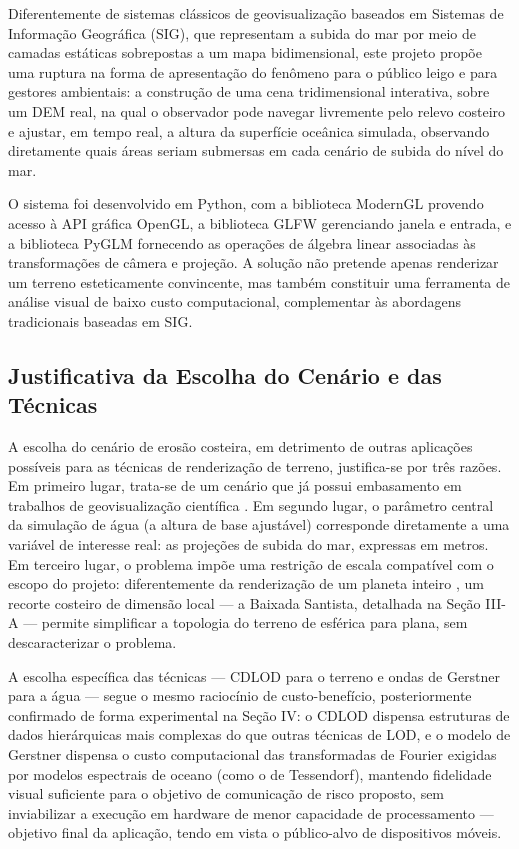 \documentclass[conference]{IEEEtran}
\begin{document}
Diferentemente de sistemas clássicos de geovisualização baseados em
Sistemas de Informação Geográfica (SIG), que representam a subida do mar
por meio de camadas estáticas sobrepostas a um mapa bidimensional, este
projeto propõe uma ruptura na forma de apresentação do fenômeno para o
público leigo e para gestores ambientais: a construção de uma cena
tridimensional interativa, sobre um DEM real, na qual o observador pode
navegar livremente pelo relevo costeiro e ajustar, em tempo real, a
altura da superfície oceânica simulada, observando diretamente quais
áreas seriam submersas em cada cenário de subida do nível do mar.

O sistema foi desenvolvido em Python, com a biblioteca ModernGL provendo
acesso à API gráfica OpenGL, a biblioteca GLFW gerenciando janela e
entrada, e a biblioteca PyGLM fornecendo as operações de álgebra linear
associadas às transformações de câmera e projeção. A solução não pretende
apenas renderizar um terreno esteticamente convincente, mas também
constituir uma ferramenta de análise visual de baixo custo computacional,
complementar às abordagens tradicionais baseadas em SIG.

\subsection{Justificativa da Escolha do Cenário e das Técnicas}

A escolha do cenário de erosão costeira, em detrimento de outras
aplicações possíveis para as técnicas de renderização de terreno,
justifica-se por três razões. Em primeiro lugar, trata-se de um cenário
que já possui embasamento em trabalhos de geovisualização científica
\cite{brown2006,dipaola2023}. Em segundo lugar, o parâmetro central da
simulação de água (a altura de base ajustável) corresponde diretamente a
uma variável de interesse real: as projeções de subida do mar, expressas
em metros. Em terceiro lugar, o problema impõe uma restrição de escala
compatível com o escopo do projeto: diferentemente da renderização de um
planeta inteiro \cite{clasenhege2006}, um recorte costeiro de dimensão
local --- a Baixada Santista, detalhada na Seção III-A --- permite
simplificar a topologia do terreno de esférica para plana, sem
descaracterizar o problema.

A escolha específica das técnicas --- CDLOD para o terreno e ondas de
Gerstner para a água --- segue o mesmo raciocínio de custo-benefício,
posteriormente confirmado de forma experimental na Seção IV: o CDLOD
dispensa estruturas de dados hierárquicas mais complexas do que outras
técnicas de LOD, e o modelo de Gerstner dispensa o custo computacional
das transformadas de Fourier exigidas por modelos espectrais de oceano
(como o de Tessendorf), mantendo fidelidade visual suficiente para o
objetivo de comunicação de risco proposto, sem inviabilizar a execução em
hardware de menor capacidade de processamento --- objetivo final da
aplicação, tendo em vista o público-alvo de dispositivos móveis.
\end{document}
